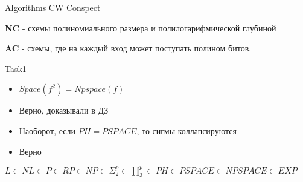 \documentclass{article}
\begin{document}
\begin{center}

\Huge Algorithms CW Conspect

\end{center}


\textbf{NC} - схемы полиномиального размера и полилогарифмической глубиной

\textbf{AC} - схемы, где на каждый вход может поступать полином битов. 

\begin{question}{Task}{1}

\begin{itemize}
             
	\item $Space(f^2) = Npspace(f)$

	\item Верно, доказывали в ДЗ
	
	\item Наоборот, если $PH = PSPACE$, то сигмы коллапсируются
	
	\item Верно

\end{itemize}
 
\end{question}

$L \subset NL \subset P \subset RP \subset NP \subset \Sigma^p_2 \subset \prod^p_3 \subset PH \subset PSPACE \subset NPSPACE \subset EXP$
\end{document}
